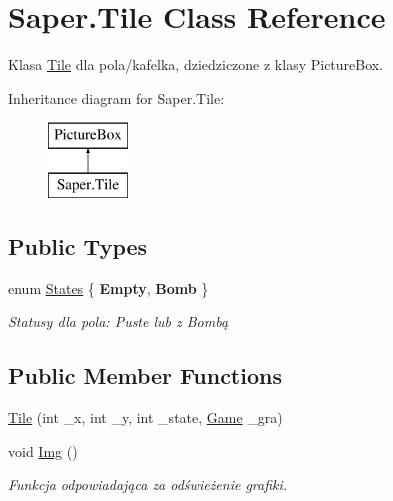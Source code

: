 \hypertarget{class_saper_1_1_tile}{}\section{Saper.\+Tile Class Reference}
\label{class_saper_1_1_tile}


Klasa \mbox{\hyperlink{class_saper_1_1_tile}{Tile}} dla pola/kafelka, dziedziczone z klasy Picture\+Box.  


Inheritance diagram for Saper.\+Tile\+:\begin{figure}[H]
\begin{center}
\leavevmode
\includegraphics[height=2.000000cm]{class_saper_1_1_tile}
\end{center}
\end{figure}
\subsection*{Public Types}
\begin{DoxyCompactItemize}
\item 
\mbox{\label{class_saper_1_1_tile_a4318bc08fbfd24d56ffa8ea1359d845c}} 
enum \mbox{\hyperlink{class_saper_1_1_tile_a4318bc08fbfd24d56ffa8ea1359d845c}{States}} \{ {\bfseries Empty}, 
{\bfseries Bomb}
 \}
\begin{DoxyCompactList}\small\item\em Statusy dla pola\+: Puste lub z Bombą \end{DoxyCompactList}\end{DoxyCompactItemize}
\subsection*{Public Member Functions}
\begin{DoxyCompactItemize}
\item 
\mbox{\hyperlink{class_saper_1_1_tile_a5225a6086870b9c2c9cad42ae248be68}{Tile}} (int \+\_\+x, int \+\_\+y, int \+\_\+state, \mbox{\hyperlink{class_saper_1_1_game}{Game}} \+\_\+gra)
\item 
\mbox{\label{class_saper_1_1_tile_a5d81eaa0b173ccb79598393706087e6d}} 
void \mbox{\hyperlink{class_saper_1_1_tile_a5d81eaa0b173ccb79598393706087e6d}{Img}} ()
\begin{DoxyCompactList}\small\item\em Funkcja odpowiadająca za odświeżenie grafiki. \end{DoxyCompactList}\end{DoxyCompactItemize}
